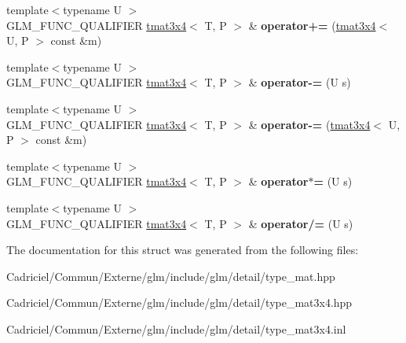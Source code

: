 \begin{DoxyCompactItemize}
\item 
{\footnotesize template$<$typename U $>$ }\\G\+L\+M\+\_\+\+F\+U\+N\+C\+\_\+\+Q\+U\+A\+L\+I\+F\+I\+ER \hyperlink{structglm_1_1detail_1_1tmat3x4}{tmat3x4}$<$ T, P $>$ \& {\bfseries operator+=} (\hyperlink{structglm_1_1detail_1_1tmat3x4}{tmat3x4}$<$ U, P $>$ const \&m)\hypertarget{structglm_1_1detail_1_1tmat3x4_a9c28e24ea115b67e1901be600e1acac3}{}\label{structglm_1_1detail_1_1tmat3x4_a9c28e24ea115b67e1901be600e1acac3}

\item 
{\footnotesize template$<$typename U $>$ }\\G\+L\+M\+\_\+\+F\+U\+N\+C\+\_\+\+Q\+U\+A\+L\+I\+F\+I\+ER \hyperlink{structglm_1_1detail_1_1tmat3x4}{tmat3x4}$<$ T, P $>$ \& {\bfseries operator-\/=} (U s)\hypertarget{structglm_1_1detail_1_1tmat3x4_a8803004a4da174ad2953f76aa6fb3aa5}{}\label{structglm_1_1detail_1_1tmat3x4_a8803004a4da174ad2953f76aa6fb3aa5}

\item 
{\footnotesize template$<$typename U $>$ }\\G\+L\+M\+\_\+\+F\+U\+N\+C\+\_\+\+Q\+U\+A\+L\+I\+F\+I\+ER \hyperlink{structglm_1_1detail_1_1tmat3x4}{tmat3x4}$<$ T, P $>$ \& {\bfseries operator-\/=} (\hyperlink{structglm_1_1detail_1_1tmat3x4}{tmat3x4}$<$ U, P $>$ const \&m)\hypertarget{structglm_1_1detail_1_1tmat3x4_ab293ffba697e138783137b5a0961afdf}{}\label{structglm_1_1detail_1_1tmat3x4_ab293ffba697e138783137b5a0961afdf}

\item 
{\footnotesize template$<$typename U $>$ }\\G\+L\+M\+\_\+\+F\+U\+N\+C\+\_\+\+Q\+U\+A\+L\+I\+F\+I\+ER \hyperlink{structglm_1_1detail_1_1tmat3x4}{tmat3x4}$<$ T, P $>$ \& {\bfseries operator$\ast$=} (U s)\hypertarget{structglm_1_1detail_1_1tmat3x4_a329a90caa5d646b47ad7af4fdd657e95}{}\label{structglm_1_1detail_1_1tmat3x4_a329a90caa5d646b47ad7af4fdd657e95}

\item 
{\footnotesize template$<$typename U $>$ }\\G\+L\+M\+\_\+\+F\+U\+N\+C\+\_\+\+Q\+U\+A\+L\+I\+F\+I\+ER \hyperlink{structglm_1_1detail_1_1tmat3x4}{tmat3x4}$<$ T, P $>$ \& {\bfseries operator/=} (U s)\hypertarget{structglm_1_1detail_1_1tmat3x4_aa6519a6c5e446e309ad26f609fdb9a74}{}\label{structglm_1_1detail_1_1tmat3x4_aa6519a6c5e446e309ad26f609fdb9a74}

\end{DoxyCompactItemize}


The documentation for this struct was generated from the following files\+:\begin{DoxyCompactItemize}
\item 
Cadriciel/\+Commun/\+Externe/glm/include/glm/detail/type\+\_\+mat.\+hpp\item 
Cadriciel/\+Commun/\+Externe/glm/include/glm/detail/type\+\_\+mat3x4.\+hpp\item 
Cadriciel/\+Commun/\+Externe/glm/include/glm/detail/type\+\_\+mat3x4.\+inl\end{DoxyCompactItemize}

